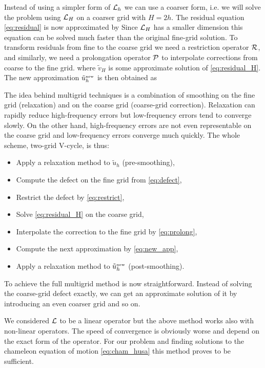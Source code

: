 Instead of using a simpler form of $\mathcal{L}_h$ we can use a coarser form, i.e. we will solve the problem using $\mathcal{L}_H$ on a coarser grid with $H=2h$. The residual equation \eqref{eq:residual} is now approximated by
Since $\mathcal{L}_H$ has a smaller dimension this equation can be solved much faster than the original fine-grid solution. To transform residuals from fine to the coarse grid we need a restriction operator $\mathcal{R}$, and similarly, we need a  prolongation operator $\mathcal{P}$ to interpolate corrections from coarse to the fine grid.
where $\tilde v_H$ is some approximate solution of \eqref{eq:residual_H}. The new approximation $\tilde u_h^\text{\tiny new}$ is then obtained as

The idea behind multigrid techniques is a combination of smoothing on the fine grid (relaxation) and on the coarse grid (coarse-grid correction). Relaxation can rapidly reduce high-frequency errors but low-frequency errors tend to converge slowly. On the other hand, high-frequency errors are not even representable on the coarse grid and low-frequency errors converge much quickly. The whole scheme, two-grid V-cycle, is thus:
\begin{itemize}
    \item Apply a relaxation method to $\tilde u_h$ (pre-smoothing),
    \item Compute the defect on the fine grid from \eqref{eq:defect},
    \item Restrict the defect by \eqref{eq:restrict},
    \item Solve \eqref{eq:residual_H} on the coarse grid,
    \item Interpolate the correction to the fine grid by \eqref{eq:prolong},
    \item Compute the next approximation by \eqref{eq:new_app},
    \item Apply a relaxation method to $\tilde u_h^\text{\tiny new}$ (post-smoothing).
\end{itemize}
To achieve the full multigrid method is now straightforward. Instead of solving the coarse-grid defect exactly, we can get an approximate solution of it by introducing an even coarser grid and so on.

We considered $\mathcal{L}$ to be a linear operator but the above method works also with non-linear operators. The speed of convergence is obviously worse and depend on the exact form of the operator. For our problem and finding solutions to the chameleon equation of motion \eqref{eq:cham_husa} this method proves to be sufficient.

